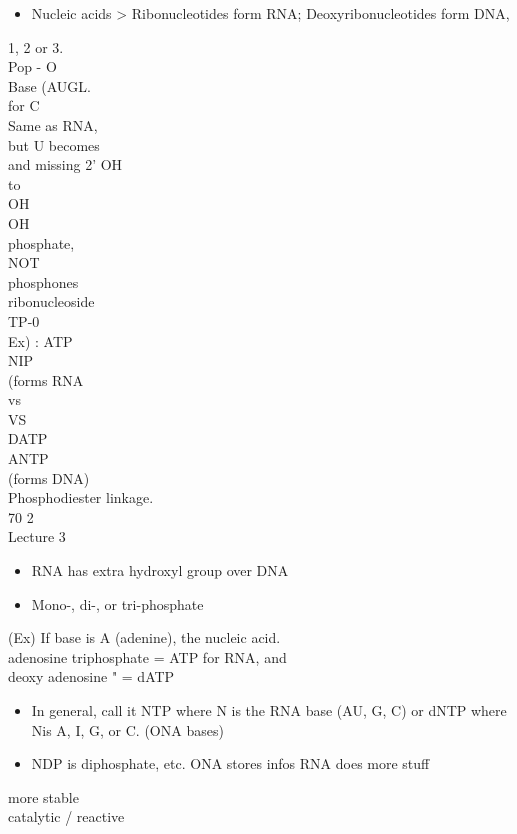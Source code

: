 \documentclass{article}
\begin{document}
\begin{itemize}
\item  Nucleic acids
> Ribonucleotides form RNA; Deoxyribonucleotides form DNA,
\end{itemize}
1, 2 or 3.\\
Pop - O\\
Base (AUGL.\\
for C\\
Same as RNA,\\
but U becomes\\
and missing 2' OH\\
to\\
OH\\
OH\\
phosphate,\\
NOT\\
phosphones\\
ribonucleoside\\
TP-0\\
Ex) : ATP\\
NIP\\
(forms RNA\\
vs\\
VS\\
DATP\\
ANTP\\
(forms DNA)\\
Phosphodiester linkage.\\
70 2\\
Lecture 3
\begin{itemize}
\item RNA has extra hydroxyl group over DNA
\item  Mono-, di-, or tri-phosphate
\end{itemize}
(Ex) If base is A (adenine), the nucleic acid.\\
adenosine triphosphate = ATP for RNA, and\\
deoxy adenosine " = dATP\\
\begin{itemize}
\item  In general, call it NTP where N is the RNA base (AU, G, C)
or dNTP where Nis A, I, G, or C. (ONA bases)
\end{itemize}
\begin{itemize}
\item  NDP is diphosphate, etc.
ONA stores infos RNA does more stuff
\end{itemize}
more stable\\
catalytic / reactive\\
\end{document}
